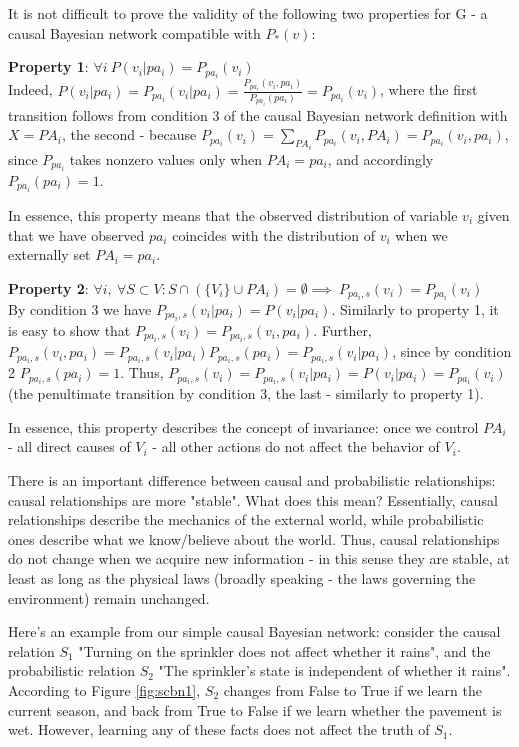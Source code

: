 \documentclass[fleqn]{article}
\numberwithin{equation}{section}
\numberwithin{theorem}{section}
\numberwithin{figure}{section}
\numberwithin{lemma}{section}
\numberwithin{corollary}{section}
\begin{document}
It is not difficult to prove the validity of the following two properties for G - a causal Bayesian network compatible with $P_*(v)$:

\textbf{Property 1}: $\forall i \ P(v_i|pa_i) = P_{pa_i}(v_i)$\\
Indeed, $P(v_i|pa_i) = P_{pa_i}(v_i|pa_i) = \frac{P_{pa_i}(v_i, pa_i)}{P_{pa_i}(pa_i)} = P_{pa_i}(v_i)$, where the first transition follows from condition 3 of the causal Bayesian network definition with $X = PA_i$, the second - because $P_{pa_i}(v_i) = \sum\limits_{PA_i}P_{pa_i}(v_i, PA_i) = P_{pa_i}(v_i, pa_i)$, since $P_{pa_i}$ takes nonzero values only when $PA_i = pa_i$, and accordingly $P_{pa_i}(pa_i) = 1$.

In essence, this property means that the observed distribution of variable $v_i$ given that we have observed $pa_i$ coincides with the distribution of $v_i$ when we externally set $PA_i = pa_i$.

\textbf{Property 2}: $\forall i, \ \forall S \subset V: S \cap (\{V_i\} \cup PA_i) = \emptyset \implies \ P_{pa_i, s}(v_i) = P_{pa_i}(v_i)$\\
By condition 3 we have $P_{pa_i,s}(v_i|pa_i) = P(v_i|pa_i)$.
Similarly to property 1, it is easy to show that $P_{pa_i,s}(v_i) = P_{pa_i,s}(v_i, pa_i)$. Further, $P_{pa_i,s}(v_i, pa_i) = P_{pa_i,s}(v_i|pa_i)P_{pa_i,s}(pa_i) = P_{pa_i,s}(v_i|pa_i)$, since by condition 2 $P_{pa_i,s}(pa_i) = 1$. Thus, $P_{pa_i,s}(v_i) = P_{pa_i,s}(v_i|pa_i) = P(v_i|pa_i) = P_{pa_i}(v_i)$ (the penultimate transition by condition 3, the last - similarly to property 1).

In essence, this property describes the concept of invariance: once we control $PA_i$ - all direct causes of $V_i$ - all other actions do not affect the behavior of $V_i$.

There is an important difference between causal and probabilistic relationships: causal relationships are more "stable". What does this mean? Essentially, causal relationships describe the mechanics of the external world, while probabilistic ones describe what we know/believe about the world. Thus, causal relationships do not change when we acquire new information - in this sense they are stable, at least as long as the physical laws (broadly speaking - the laws governing the environment) remain unchanged.

Here's an example from our simple causal Bayesian network: consider the causal relation $S_1$ "Turning on the sprinkler does not affect whether it rains", and the probabilistic relation $S_2$ "The sprinkler's state is independent of whether it rains". According to Figure \ref{fig:scbn1}, $S_2$ changes from False to True if we learn the current season, and back from True to False if we learn whether the pavement is wet. However, learning any of these facts does not affect the truth of $S_1$. 
\end{document}
